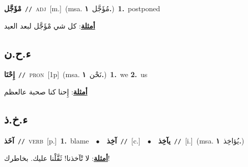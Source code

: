 \documentclass[10pt,a4paper,twoside]{article} %
\begin{document}
\begin{multicols}{2}
{\setlength\topsep{0pt}\textbf{\foreignlanguage{arabic}{مْؤَجَّل}}\ {\color{gray}\texttt{//}\color{black}}\ \textsc{adj}\ [m.]\ \color{gray}(msa. \foreignlanguage{arabic}{مُؤَجَّل}~\foreignlanguage{arabic}{\textbf{١.}})\color{black}\ \textbf{1.}~postponed\  \begin{flushright}\color{gray}\foreignlanguage{arabic}{\textbf{\underline{\foreignlanguage{arabic}{أمثلة}}}: كل شي مْؤَجَّل لبعد العيد}\end{flushright}\color{black}} \vspace{2mm}

\vspace{-3mm}
\subsection*{\color{blue}\foreignlanguage{arabic}{ء.ح.ن}\color{blue}{ (ntws)}} 

{\setlength\topsep{0pt}\textbf{\foreignlanguage{arabic}{إِحْنَا}}\ {\color{gray}\texttt{//}\color{black}}\ \textsc{pron}\ [1p]\ \color{gray}(msa. \foreignlanguage{arabic}{نَحْن}~\foreignlanguage{arabic}{\textbf{١.}})\color{black}\ \textbf{1.}~we  \textbf{2.}~us\  \begin{flushright}\color{gray}\foreignlanguage{arabic}{\textbf{\underline{\foreignlanguage{arabic}{أمثلة}}}: إِحنا كنا صحبة عالعظم}\end{flushright}\color{black}} \vspace{2mm}

\vspace{-3mm}
\subsection*{\color{blue}\foreignlanguage{arabic}{ء.خ.ذ}\color{blue}{}} 

{\setlength\topsep{0pt}\textbf{\foreignlanguage{arabic}{آخَذ}}\ {\color{gray}\texttt{//}\color{black}}\ \textsc{verb}\ [p.]\ \textbf{1.}~blame\ \ $\bullet$\ \ \setlength\topsep{0pt}\textbf{\foreignlanguage{arabic}{آخِذ}}\ {\color{gray}\texttt{//}\color{black}}\ [c.]\ \ $\bullet$\ \ \setlength\topsep{0pt}\textbf{\foreignlanguage{arabic}{يآخِذ}}\ {\color{gray}\texttt{//}\color{black}}\ [i.]\ \color{gray}(msa. \foreignlanguage{arabic}{يُؤاخِذ}~\foreignlanguage{arabic}{\textbf{١.}})\color{black}\  \begin{flushright}\color{gray}\foreignlanguage{arabic}{\textbf{\underline{\foreignlanguage{arabic}{أمثلة}}}: لا تْآخذنا! ثَقَّلْنا عليك. بخاطرك!}\end{flushright}\color{black}} \vspace{2mm}


\end{multicols}
\end{document}
